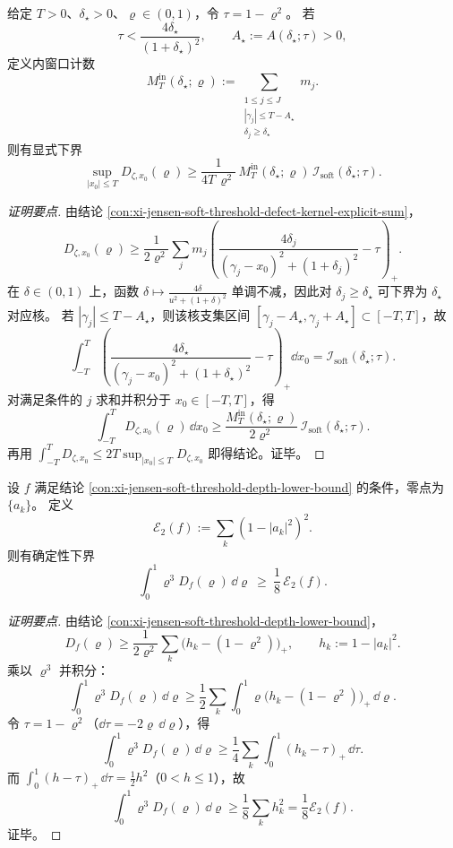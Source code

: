 \begin{conclusion}\label{con:xi-jensen-soft-threshold-window-sup-lower-bound}
给定 \(T>0\)、\(\delta_\star>0\)、\(\varrho\in(0,1)\)，令 \(\tau=1-\varrho^2\)。
若
\[
\tau<\frac{4\delta_\star}{(1+\delta_\star)^2},
\qquad
A_\star:=A(\delta_\star;\tau)>0,
\]
定义内窗口计数
\[
M_T^{\mathrm{in}}(\delta_\star;\varrho)
:=\sum_{\substack{1\le j\le J\\ |\gamma_j|\le T-A_\star\\ \delta_j\ge \delta_\star}}m_j.
\]
则有显式下界
\[
\sup_{|x_0|\le T}D_{\zeta,x_0}(\varrho)
\ge
\frac{1}{4T\,\varrho^2}\,
M_T^{\mathrm{in}}(\delta_\star;\varrho)\,
\mathcal I_{\mathrm{soft}}(\delta_\star;\tau).
\]
\end{conclusion}
\begin{proof}[证明要点]
由结论 \ref{con:xi-jensen-soft-threshold-defect-kernel-explicit-sum}，
\[
D_{\zeta,x_0}(\varrho)\ge
\frac1{2\varrho^2}\sum_j m_j
\left(\frac{4\delta_j}{(\gamma_j-x_0)^2+(1+\delta_j)^2}-\tau\right)_+.
\]
在 \(\delta\in(0,1)\) 上，函数
\(
\delta\mapsto \frac{4\delta}{u^2+(1+\delta)^2}
\)
单调不减，因此对 \(\delta_j\ge\delta_\star\) 可下界为 \(\delta_\star\) 对应核。
若 \(|\gamma_j|\le T-A_\star\)，则该核支集区间 \([\gamma_j-A_\star,\gamma_j+A_\star]\subset[-T,T]\)，故
\[
\int_{-T}^{T}\left(\frac{4\delta_\star}{(\gamma_j-x_0)^2+(1+\delta_\star)^2}-\tau\right)_+\dd x_0
=\mathcal I_{\mathrm{soft}}(\delta_\star;\tau).
\]
对满足条件的 \(j\) 求和并积分于 \(x_0\in[-T,T]\)，得
\[
\int_{-T}^{T}D_{\zeta,x_0}(\varrho)\,\dd x_0
\ge
\frac{M_T^{\mathrm{in}}(\delta_\star;\varrho)}{2\varrho^2}\,
\mathcal I_{\mathrm{soft}}(\delta_\star;\tau).
\]
再用
\(
\int_{-T}^{T}D_{\zeta,x_0}\le 2T\sup_{|x_0|\le T}D_{\zeta,x_0}
\)
即得结论。证毕。
\end{proof}

\begin{conclusion}\label{con:xi-jensen-defect-weighted-integral-controls-square-depth-energy}
设 \(f\) 满足结论 \ref{con:xi-jensen-soft-threshold-depth-lower-bound} 的条件，零点为 \(\{a_k\}\)。
定义
\[
\mathcal E_2(f):=\sum_k(1-|a_k|^2)^2.
\]
则有确定性下界
\[
\int_0^1\varrho^3D_f(\varrho)\,\dd\varrho\ \ge\ \frac18\,\mathcal E_2(f).
\]
\end{conclusion}
\begin{proof}[证明要点]
由结论 \ref{con:xi-jensen-soft-threshold-depth-lower-bound}，
\[
D_f(\varrho)\ge \frac1{2\varrho^2}\sum_k\bigl(h_k-(1-\varrho^2)\bigr)_+,\qquad h_k:=1-|a_k|^2.
\]
乘以 \(\varrho^3\) 并积分：
\[
\int_0^1\varrho^3D_f(\varrho)\,\dd\varrho
\ge
\frac12\sum_k\int_0^1\varrho\bigl(h_k-(1-\varrho^2)\bigr)_+\,\dd\varrho.
\]
令 \(\tau=1-\varrho^2\)（\(\dd\tau=-2\varrho\,\dd\varrho\)），得
\[
\int_0^1\varrho^3D_f(\varrho)\,\dd\varrho
\ge
\frac14\sum_k\int_0^1(h_k-\tau)_+\,\dd\tau.
\]
而 \(\int_0^1(h-\tau)_+\,\dd\tau=\frac12h^2\)（\(0<h\le 1\)），故
\[
\int_0^1\varrho^3D_f(\varrho)\,\dd\varrho
\ge
\frac18\sum_k h_k^2
=\frac18\mathcal E_2(f).
\]
证毕。
\end{proof}

